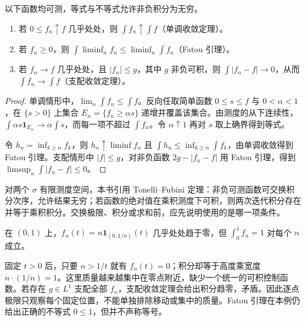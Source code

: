 \begin{theorem}[三个收敛工具]\label{thm:fa-measure-convergence}
以下函数均可测，等式与不等式允许非负积分为无穷。
\begin{enumerate}
 \item 若 $0\leq f_n\uparrow f$ 几乎处处，则 $\int f_n\uparrow\int f$（单调收敛定理）。
 \item 若 $f_n\geq0$，则 $\int\liminf_nf_n\leq\liminf_n\int f_n$（Fatou 引理）。
 \item 若 $f_n\to f$ 几乎处处，且 $|f_n|\leq g$，其中 $g$ 非负可积，则 $\int|f_n-f|\to0$，从而 $\int f_n\to\int f$（支配收敛定理）。
\end{enumerate}
\end{theorem}
\begin{proof}
单调情形中，$\lim_n\int f_n\leq\int f$。反向任取简单函数 $0\leq s\leq f$ 与 $0<\alpha<1$，在 $\{s>0\}$ 上集合 $E_n=\{f_n\geq\alpha s\}$ 递增并覆盖该集合。由测度的从下连续性，$\int\alpha s\mathbf1_{E_n}\to\alpha\int s$，而每一项不超过 $\int f_n$。令 $\alpha\uparrow1$ 再对 $s$ 取上确界得到等式。

令 $h_n=\inf_{k\geq n}f_k$，则 $h_n\uparrow\liminf f_n$ 且 $\int h_n\leq\inf_{k\geq n}\int f_k$，由单调收敛得到 Fatou 引理。支配情形中 $|f|\leq g$，对非负函数 $2g-|f_n-f|$ 用 Fatou 引理，得到 $\limsup_n\int|f_n-f|\leq0$。
\end{proof}
对两个 $\sigma$ 有限测度空间，本书引用 Tonelli--Fubini 定理：非负可测函数可交换积分次序，允许结果无穷；若函数的绝对值在乘积测度下可积，则两次迭代积分存在并等于乘积积分。交换极限、积分或求和前，应先说明使用的是哪一项条件。

\begin{example}[为什么极限与积分不能随意交换]
在 $(0,1)$ 上，$f_n(t)=n\mathbf1_{(0,1/n)}(t)$ 几乎处处趋于零，但 $\int_0^1f_n=1$ 对每个 $n$ 成立。
\end{example}
\begin{solve}
固定 $t>0$ 后，只要 $n>1/t$ 就有 $f_n(t)=0$；积分却等于高度乘宽度 $n\cdot(1/n)=1$。这里质量越来越集中在零点附近，缺少一个统一的可积控制函数。若存在 $g\in L^1$ 支配全部 $f_n$，支配收敛定理会给出积分趋零，矛盾。因此逐点极限只观察每个固定位置，不能单独排除移动或集中的质量。Fatou 引理在本例仍给出正确的不等式 $0\leq1$，但并不声称等号。
\end{solve}

